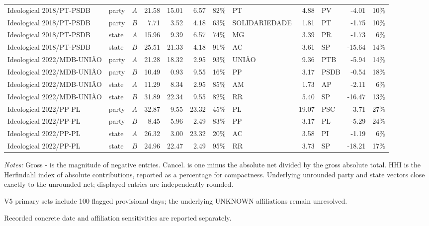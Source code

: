 \begin{landscape}
\begin{longtable}{L{4.3cm}llrrrrL{2.0cm}rL{2.0cm}rr}
Ideological 2018/PT-PSDB & party & \(A\) & 21.58 & 15.01 & 6.57 & 82\% & PT & 4.88 & PV & -4.01 & 10\% \\
Ideological 2018/PT-PSDB & party & \(B\) & 7.71 & 3.52 & 4.18 & 63\% & SOLIDARIEDADE & 1.81 & PT & -1.75 & 10\% \\
Ideological 2018/PT-PSDB & state & \(A\) & 15.96 & 9.39 & 6.57 & 74\% & MG & 3.39 & PR & -1.73 & 6\% \\
Ideological 2018/PT-PSDB & state & \(B\) & 25.51 & 21.33 & 4.18 & 91\% & AC & 3.61 & SP & -15.64 & 14\% \\
Ideological 2022/MDB-UNIÃO & party & \(A\) & 21.28 & 18.32 & 2.95 & 93\% & UNIÃO & 9.36 & PTB & -5.94 & 14\% \\
Ideological 2022/MDB-UNIÃO & party & \(B\) & 10.49 & 0.93 & 9.55 & 16\% & PP & 3.17 & PSDB & -0.54 & 18\% \\
Ideological 2022/MDB-UNIÃO & state & \(A\) & 11.29 & 8.34 & 2.95 & 85\% & AM & 1.73 & AP & -2.11 & 6\% \\
Ideological 2022/MDB-UNIÃO & state & \(B\) & 31.89 & 22.34 & 9.55 & 82\% & RR & 5.40 & SP & -16.47 & 13\% \\
Ideological 2022/PP-PL & party & \(A\) & 32.87 & 9.55 & 23.32 & 45\% & PL & 19.07 & PSC & -3.71 & 27\% \\
Ideological 2022/PP-PL & party & \(B\) & 8.45 & 5.96 & 2.49 & 83\% & PP & 3.17 & PL & -5.29 & 24\% \\
Ideological 2022/PP-PL & state & \(A\) & 26.32 & 3.00 & 23.32 & 20\% & AC & 3.58 & PI & -1.19 & 6\% \\
Ideological 2022/PP-PL & state & \(B\) & 24.96 & 22.47 & 2.49 & 95\% & RR & 3.73 & SP & -18.21 & 17\% \\
\end{longtable}
\noindent\footnotesize\textit{Notes:} Gross - is the magnitude of negative entries. Cancel. is one minus the absolute net divided by the gross absolute total. HHI is the Herfindahl index of absolute contributions, reported as a percentage for compactness. Underlying unrounded party and state vectors close exactly to the unrounded net; displayed entries are independently rounded.
\endgroup
\end{landscape}

\par{\footnotesize V5 primary sets include 100 flagged provisional days; the underlying UNKNOWN affiliations remain unresolved.}\par{\footnotesize Recorded concrete date and affiliation sensitivities are reported separately.}

